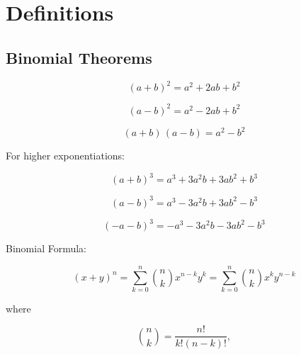 \section{Definitions}


\vspace{0.5cm}\subsection{Binomial Theorems}

\vspace{0.5cm}\begin{definition}\label{def-biomial-theorems}

    \begin{equation}
        (a+b)^2 = a^2 + 2ab + b^2 \label{eq-1}
    \end{equation}

    \begin{equation}
        (a-b)^2 = a^2 - 2ab + b^2 \label{eq-2}
    \end{equation}

    \begin{equation}
        (a+b)\,(a-b) = a^2 - b^2 \label{eq-3}
    \end{equation}

    \flushleft \normalfont For higher exponentiations:  

    \begin{equation}
        (a+b)^3 = a^3 +3a^2b + 3ab^2 + b^3 \label{eq-4}
    \end{equation}

    \begin{equation}
        (a-b)^3 = a^3 - 3a^2b + 3ab^2 - b^3 \label{eq-5}
    \end{equation}

    \begin{equation}
        (-a-b)^3 = -a^3 - 3a^2b - 3ab^2 - b^3 \label{eq-6}
    \end{equation}

    Binomial Formula:

    \begin{equation}
        (x+y)^{n}=\sum _{k=0}^{n}{n \choose k}x^{n-k}y^{k}=\sum _{k=0}^{n}{n \choose k}x^{k}y^{n-k} \label{eq-7}
    \end{equation}

    where

    \begin{equation}
        {\displaystyle {\binom {n}{k}}={\frac {n!}{k!(n-k)!}},} \label{eq-8}
    \end{equation}
    
\end{definition}

